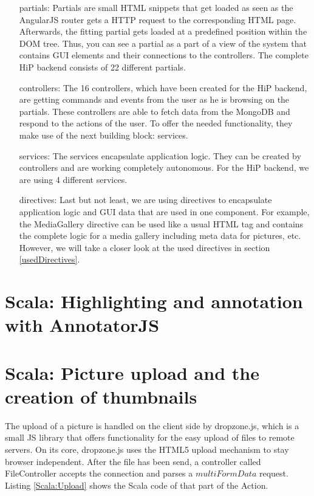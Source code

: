 \begin{itemize}
	\item[partials:] Partials are small \ac{HTML} snippets that get loaded as seen as the AngularJS router gets a \ac{HTTP} request to the corresponding \ac{HTML} page. Afterwards, the fitting partial gets loaded at a predefined position within the \ac{DOM} tree. Thus, you can see a partial as a part of a view of the system that contains \ac{GUI} elements and their connections to the controllers.  The complete \ac{HiP} backend consists of 22 different partials.  
	\item[controllers:] The 16 controllers, which have been created for the \ac{HiP} backend, are getting commands and events from the user as he is browsing on the partials. These controllers are able to fetch data from the MongoDB and respond to the actions of the user. To offer the needed functionality, they make use of the next building block: services.  
	\item[services:] The services encapsulate application logic. They can be created by controllers and are working completely autonomous. For the \ac{HiP} backend, we are using 4 different services.
	\item[directives:] Last but not least, we are using directives to encapsulate application logic and \ac{GUI} data that are used in one component. For example, the MediaGallery directive can be used like a usual \ac{HTML} tag and contains the complete logic for a media gallery including meta data for pictures, etc. However, we will take a closer look at the used directives in section \ref{usedDirectives}.
\end{itemize}

\section{Scala: Highlighting and annotation with AnnotatorJS}

\section{Scala: Picture upload and the creation of thumbnails}
The upload of a picture is handled on the client side by dropzone.js, which is a small \ac{JS} library that offers functionality for the easy upload of files to remote servers. On its core, dropzone.js uses the \ac{HTML5} upload mechanism to stay  browser independent. After the file has been send, a controller called FileController accepts the connection and parses a $multiFormData$ request. Listing \ref{Scala:Upload} shows the Scala code of that part of the Action.

